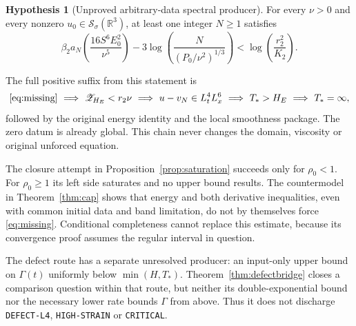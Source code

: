 \documentclass[11pt,a4paper]{article}
\theoremstyle{definition}\newtheorem{definition}[theorem]{Definition}
\newtheorem{hypothesis}[theorem]{Hypothesis}
\theoremstyle{remark}\newtheorem{remark}[theorem]{Remark}
\newcommand{\R}{\mathbb R}
\newcommand{\Sch}{\mathcal S_\sigma(\R^3)}
\newcommand{\Zcert}{\mathscr Z}
\numberwithin{equation}{section}
\begin{document}
\begin{hypothesis}[Unproved arbitrary-data spectral producer]\label{hyp:producer}
For every $\nu>0$ and every nonzero $u_0\in\Sch$, at least one integer $N\ge1$ satisfies
\begin{equation}\label{eq:missing}
 \boxed{\quad
 \beta_2a_N\!\left(\frac{16S^6E_0^2}{\nu^5}\right)
 -3\log\!\left(\frac{N}{(P_0/\nu^2)^{1/3}}\right)
 <\log\!\left(\frac{r_2^2}{K_2}\right).
 \quad}
\end{equation}
\end{hypothesis}
The full positive suffix from this statement is
\[
 \eqref{eq:missing}\ \Longrightarrow\ \Zcert_{H_E}<r_2\nu
 \ \Longrightarrow\ u-v_N\in L^4_tL^6_x
 \ \Longrightarrow\ T_*>H_E\ \Longrightarrow\ T_*=\infty,
\]
followed by the original energy identity and the local smoothness package. The zero datum is already global. This chain never changes the domain, viscosity or original unforced equation.

The closure attempt in Proposition~\ref{prop:saturation} succeeds only for $\rho_0<1$. For $\rho_0\ge1$ its left side saturates and no upper bound results. The countermodel in Theorem~\ref{thm:cap} shows that energy and both derivative inequalities, even with common initial data and band limitation, do not by themselves force \eqref{eq:missing}. Conditional completeness cannot replace this estimate, because its convergence proof assumes the regular interval in question.

The defect route has a separate unresolved producer: an input-only upper bound on $\Gamma(t)$ uniformly below $\min(H,T_*)$. Theorem~\ref{thm:defectbridge} closes a comparison question within that route, but neither its double-exponential bound nor the necessary lower rate bounds $\Gamma$ from above. Thus it does not discharge \texttt{DEFECT-L4}, \texttt{HIGH-STRAIN} or \texttt{CRITICAL}.
\end{document}
